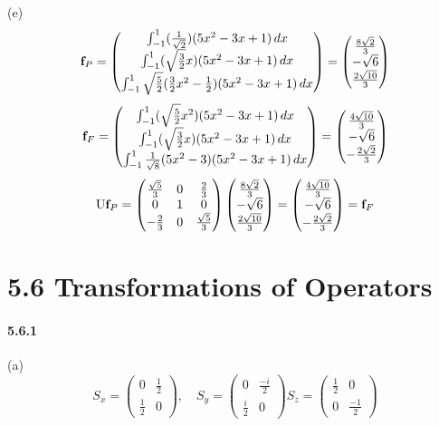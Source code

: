 \documentclass[a4paper]{article}
\begin{document}
(e) 
\renewcommand{\arraystretch}{2}
\[
\mathbf{f}_{P}=
\begin{pmatrix}
\int_{-1}^1(\frac{1}{\sqrt{2}})(5x^2-3x+1)\,dx\\
\int_{-1}^1(\sqrt{\frac{3}{2}}x)(5x^2-3x+1)\,dx\\
\int_{-1}^1\sqrt{\frac{5}{2}}(\frac{3}{2}x^2-\frac{1}{2})(5x^2-3x+1)\,dx\\
\end{pmatrix}=
\begin{pmatrix}
\frac{8\sqrt{2}}{3}\\-\sqrt{6}\\\frac{2\sqrt{10}}{3}
\end{pmatrix}
\]
\[
\mathbf{f}_{F}=
\begin{pmatrix}
\int_{-1}^1(\sqrt{\frac{5}{2}}x^2)(5x^2-3x+1)\,dx\\
\int_{-1}^1(\sqrt{\frac{3}{2}}x)(5x^2-3x+1)\,dx\\
\int_{-1}^1\frac{1}{\sqrt{8}}(5x^2-3)(5x^2-3x+1)\,dx\\
\end{pmatrix}=
\begin{pmatrix}
\frac{4\sqrt{10}}{3}\\-\sqrt{6}\\-\frac{2\sqrt{2}}{3}
\end{pmatrix}
\]
\[
\mathrm{U}\mathbf{f}_{P}=\begin{pmatrix}
\frac{\sqrt{5}}{3}&0&\frac{2}{3}\\
0&1&0\\
-\frac{2}{3}&0&\frac{\sqrt{5}}{3}
\end{pmatrix}
\begin{pmatrix}
\frac{8\sqrt{2}}{3}\\-\sqrt{6}\\\frac{2\sqrt{10}}{3}
\end{pmatrix}=
\begin{pmatrix}
\frac{4\sqrt{10}}{3}\\-\sqrt{6}\\-\frac{2\sqrt{2}}{3}
\end{pmatrix}=\mathbf{f}_F
\]

\section*{5.6 Transformations of Operators}

\paragraph{5.6.1}
\renewcommand{\arraystretch}{1.2}
(a) 
\[
S_x=
\begin{pmatrix}
0&\frac{1}{2}\\
\frac{1}{2}&0
\end{pmatrix},\quad
S_y=
\begin{pmatrix}
0&\frac{-i}{2}\\
\frac{i}{2}&0
\end{pmatrix}
S_z=
\begin{pmatrix}
\frac{1}{2}&0\\
0&\frac{-1}{2}
\end{pmatrix}
\]
\end{document}
